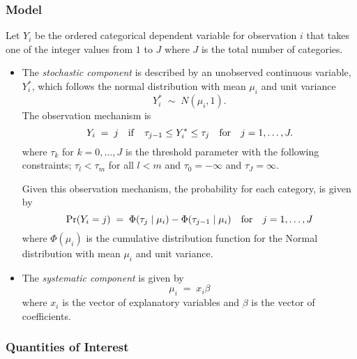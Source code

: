 \subsubsection{Model}
  Let $Y_i$ be the ordered categorical dependent variable for
  observation $i$ that takes one of the integer values from $1$ to $J$
  where $J$ is the total number of categories.
\begin{itemize}
\item The \emph{stochastic component} is described by an unobserved continuous
  variable, $Y^*_i$, which follows the normal distribution with mean
  $\mu_i$ and unit variance
  \begin{equation*}
    Y_i^* \; \sim \; N(\mu_i, 1). 
  \end{equation*}
  The observation mechanism is 
  \begin{equation*}
    Y_i \; = \; j \quad {\rm if} \quad \tau_{j-1} \le Y_i^* \le \tau_j
    \quad {\rm for} \quad j=1,\dots,J.
  \end{equation*}
  where $\tau_k$ for $k=0,\dots,J$ is the threshold parameter with the
  following constraints; $\tau_l < \tau_m$ for all $l<m$ and
  $\tau_0=-\infty$ and $\tau_J=\infty$.
  
  Given this observation mechanism, the probability for each category,
  is given by
  \begin{equation*}
    \Pr(Y_i = j) \; = \; \Phi(\tau_{j} \mid \mu_i) - \Phi(\tau_{j-1} \mid
    \mu_i) \quad {\rm for} \quad j=1,\dots,J
  \end{equation*}
  where $\Phi(\mu_i)$ is the cumulative distribution function for the
  Normal distribution with mean $\mu_i$ and unit variance.
  
\item The \emph{systematic component} is given by
  \begin{equation*}
    \mu_i \; = \; x_i \beta
  \end{equation*}
  where $x_i$ is the vector of explanatory variables and $\beta$ is
  the vector of coefficients.
\end{itemize}

\subsubsection{Quantities of Interest} 


